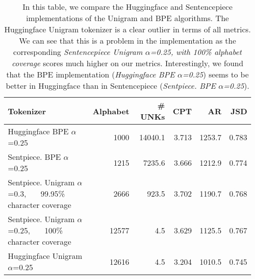 \begin{table}
\caption{In this table, we compare the Huggingface and Sentencepiece implementations of the Unigram and BPE algorithms. The Huggingface Unigram tokenizer is a clear outlier in terms of all metrics. We can see that this is a problem in the implementation as the corresponding \textit{Sentencepiece Unigram $\alpha$=0.25, with 100\% alphabet coverage} scores much higher on our metrics. Interestingly, we found that the BPE implementation (\textit{Huggingface BPE $\alpha$=0.25}) seems to be better in Huggingface than in Sentencepiece (\textit{Sentpiece. BPE $\alpha$=0.25}).}
\label{tab:hugg_vs_sentpiece}
\begin{tabular}{lrrrrr}
\toprule
Tokenizer & Alphabet & \# UNKs & CPT & AR & JSD \\
\midrule
Huggingface BPE $\alpha$=0.25 & 1000 & 14040.1 & 3.713 & 1253.7 & 0.783 \\
Sentpiece. BPE $\alpha$=0.25 & 1215 & 7235.6 & 3.666 & 1212.9 & 0.774 \\
\makecell[l]{Sentpiece. Unigram $\alpha$=0.3, \\ ~~~99.95\% character coverage} & 2666 & 923.5 & 3.702 & 1190.7 & 0.768 \\
\makecell[l]{Sentpiece. Unigram $\alpha$=0.25, \\ ~~~100\% character coverage} & 12577 & 4.5 & 3.629 & 1125.5 & 0.767 \\
Huggingface Unigram $\alpha$=0.25 & 12616 & 4.5 & 3.204 & 1010.5 & 0.745 \\
\bottomrule
\end{tabular}
\end{table}
